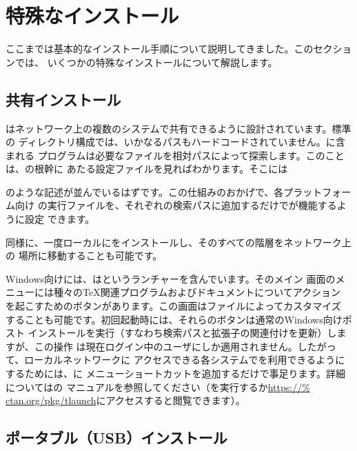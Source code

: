 \documentclass[uplatex,dvipdfmx,12pt]{jsarticle}
\begin{document}
\section{特殊なインストール}

ここまでは基本的なインストール手順について説明してきました。このセクションでは、
いくつかの特殊なインストールについて解説します。

\subsection{共有インストール}
\label{sec:sharedinstall}

\TL はネットワーク上の複数のシステムで共有できるように設計されています。標準の
ディレクトリ構成では、いかなるパスもハードコードされていません。\TL に含まれる
プログラムは必要なファイルを相対パスによって探索します。このことは、\TL の根幹に
あたる設定ファイルを見ればわかります。そこには
%
%
のような記述が並んでいるはずです。この仕組みのおかげで、各プラットフォーム向け
の実行ファイルを、それぞれの検索パスに追加するだけで\TL が機能するように設定
できます。

同様に、一度ローカルに\TL をインストールし、そのすべての階層をネットワーク上の
場所に移動することも可能です。

Windows向けには、\TL はというランチャーを含んでいます。そのメイン
画面のメニューには種々の\TeX 関連プログラムおよびドキュメントについてアクション
を起こすためのボタンがあります。この画面はファイルによってカスタマイズ
することも可能です。初回起動時には、それらのボタンは通常のWindows向けポスト
インストールを実行（すなわち検索パスと拡張子の関連付けを更新）しますが、この操作
は現在ログイン中のユーザにしか適用されません。したがって、ローカルネットワークに
アクセスできる各システムで\TL を利用できるようにするためには、に
メニューショートカットを追加するだけで事足ります。詳細についてはの
マニュアルを参照してください（を実行するか\url{https://%
ctan.org/pkg/tlaunch}にアクセスすると閲覧できます）。

\subsection{ポータブル（USB）インストール}
\label{sec:portable-tl}
\end{document}
